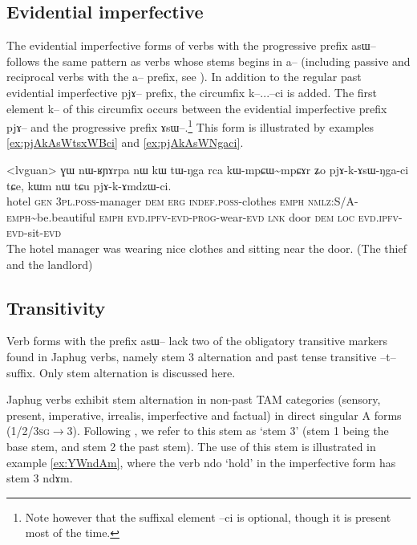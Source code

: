 \documentclass[oldfontcommands,oneside,a4paper,11pt]{article}
\newcommand{\ipa}[1]{{\phon \mbox{#1}}} %
\begin{document}
\subsection{Evidential imperfective}

The evidential imperfective forms of verbs with the progressive prefix \ipa{asɯ--} follows the same pattern as verbs whose stems begins in \ipa{a--} (including passive and reciprocal verbs with the \ipa{a--} prefix, see \citealt{jacques07passif}). In addition to the regular past evidential imperfective \ipa{pjɤ--} prefix, the circumfix \ipa{k--}...\ipa{--ci} is added. The first element \ipa{k--} of this circumfix occurs between the evidential imperfective prefix \ipa{pjɤ--} and the progressive prefix \ipa{ɤsɯ--}.\footnote{Note however that the suffixal element \ipa{--ci} is optional, though it is present most of the time.} This form is illustrated by examples \ref{ex:pjAkAsWtsxWBci} and \ref{ex:pjAkAsWNgaci}.

\begin{exe}
\ex \label{ex:pjAkAsWNgaci}
\gll
<lvguan>	\ipa{ɣɯ} 	\ipa{nɯ-ʁɲɤrpa} 	\ipa{nɯ} 	\ipa{kɯ} 	\ipa{tɯ-ŋga} 	\ipa{rca} 	\ipa{kɯ-mpɕɯ\textasciitilde{}mpɕɤr} 	\ipa{ʑo} 	\ipa{pjɤ-k-ɤsɯ-ŋga-ci} 	\ipa{tɕe,} 	\ipa{kɯm} 	\ipa{nɯ} 	\ipa{tɕu} 	\ipa{pjɤ-k-ɤmdzɯ-ci.} 	\\
hotel \textsc{gen} \textsc{3pl.poss}-manager \textsc{dem} \textsc{erg} \textsc{indef.poss}-clothes \textsc{emph} \textsc{nmlz:S/A-emph}\textasciitilde{}be.beautiful \textsc{emph} \textsc{evd.ipfv-evd-prog}-wear-\textsc{evd} \textsc{lnk} door \textsc{dem} \textsc{loc} \textsc{evd.ipfv-evd}-sit-\textsc{evd}
\\
\glt The hotel manager was wearing nice clothes and sitting near the door. (The thief and the landlord)
\end{exe}

\subsection{Transitivity}

Verb forms with the prefix \ipa{asɯ--} lack two of the obligatory transitive markers found in Japhug verbs, namely stem 3 alternation and past tense transitive \ipa{--t--} suffix. Only stem alternation is discussed here.

Japhug verbs exhibit stem alternation in non-past TAM categories (sensory, present, imperative, irrealis, imperfective and factual) in direct singular A forms (\textsc{1/2/3sg}$\rightarrow$3). Following \citet{jackson00puxi}, we refer to this stem as `stem 3' (stem 1 being the base stem, and stem 2 the past stem). The use of this stem is illustrated in example \ref{ex:YWndAm}, where the verb \ipa{ndo} `hold' in the imperfective form has stem 3 \ipa{ndɤm}.
\end{document}
